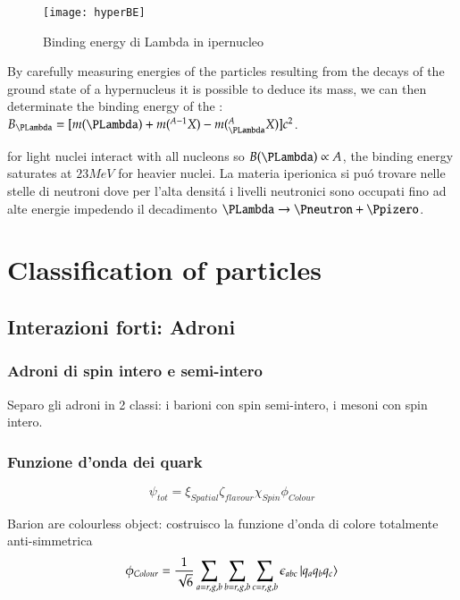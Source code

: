 \documentclass[main.tex]{subfiles}
\begin{document}
\begin{figure}[!ht]
\centering
\texttt{[image: hyperBE]}
\caption{Binding energy di Lambda in ipernucleo}
\label{fig:hyperdBE}
\end{figure}



By carefully measuring energies of the particles resulting from the decays of the ground state of a hypernucleus it is possible to deduce its mass, we can then determinate the binding energy of the \PLambda: $B_{\PLambda}=[m(\PLambda)+m(^{A-1}X)-m(^A_{\PLambda}X)]c^2$.

for light nuclei \PLambda interact with all nucleons so $B(\PLambda)\propto A$, the binding energy saturates at $23 MeV$ for heavier nuclei. La materia iperionica si pu\'o trovare nelle stelle di neutroni dove per l'alta densit\'a i livelli neutronici sono occupati fino ad alte energie impedendo il decadimento $\PLambda\rightarrow\Pneutron+\Ppizero$.

\clearpage

\chapter{Classification of particles}

 
\section{Interazioni forti: Adroni}

\subsection{Adroni di spin intero e semi-intero}
Separo gli adroni in 2 classi: i barioni con spin semi-intero, i mesoni con spin intero.


\subsection{Funzione d'onda dei quark}

\begin{equation*}
\psi_{tot}=\xi_{Spatial}\zeta_{flavour}\chi_{Spin}\phi_{Colour}
\end{equation*}

Barion are colourless object: costruisco la funzione d'onda di colore totalmente anti-simmetrica
\begin{equation*}
\phi_{Colour}=\frac{1}{\sqrt{6}}\sum_{a=r,g,b}\sum_{b=r,g,b}\sum_{c=r,g,b}\epsilon_{abc}\ket{q_aq_bq_c}
\end{equation*}
\end{document}

